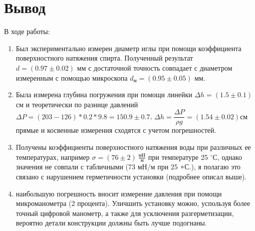 \documentclass[a4paper,12pt]{article}
\theoremstyle{definition}
\begin{document}
	\section{Вывод}
	В ходе работы:
	\begin{enumerate}
		\item Был экспериментально измерен диаметр иглы при помощи коэффициента поверхностного натяжения спирта. Полученный результат $d = (0.97\pm 0.02)\text{ мм}$ с достаточной точность совпадает с диаметром измеренным с помощью микроскопа $d_{м} = (0.95\pm 0.05)\text{ мм}$.
		\item Была измерена глубина погружения при помощи линейки $\Delta h = (1.5\pm0.1)$ см и теоретически по разнице давлений $\Delta P = (203-126)*0.2*9.8 = 150.9\pm0.7$, $\Delta h = \dfrac{\Delta P}{\rho g} = (1.54\pm0.02)см$ прямые и косвенные измерения сходятся с учетом погрешностей.
		\item Получены коэффициенты поверхностного натяжения воды при различных ее температурах, например $\sigma = (76\pm 2)\:\frac{\text{мН}}{\text{м}}$ при температуре 25 $^\circ$С, однако значения не совпали с табличными (73 мН/м при 25 ∘С.), я полагаю это связано с нарушением герметичности установки (подробнее описал выше).
		\item наибольшую погрешность вносит измерение давления при помощи микроманометра (2 процента). Уличшить установку можно, успользуя более точный цифровой манометр, а также для усключения разгерметизации, вероятно детали конструкции должны быть лучше подогнаны. 
	\end{enumerate}
	
	
	
	
	
	
	
\end{document}

